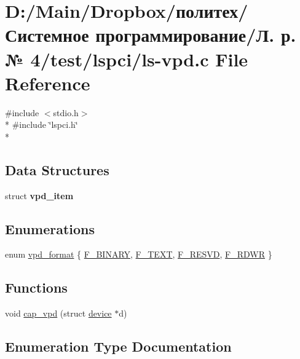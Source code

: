 \hypertarget{ls-vpd_8c}{}\section{D\+:/\+Main/\+Dropbox/политех/Системное программирование/Л. р. № 4/test/lspci/ls-\/vpd.c File Reference}
\label{ls-vpd_8c}
{\ttfamily \#include $<$stdio.\+h$>$}\\*
{\ttfamily \#include \char`\"{}lspci.\+h\char`\"{}}\\*
\subsection*{Data Structures}
\begin{DoxyCompactItemize}
\item 
struct {\bfseries vpd\+\_\+item}
\end{DoxyCompactItemize}
\subsection*{Enumerations}
\begin{DoxyCompactItemize}
\item 
enum \hyperlink{ls-vpd_8c_a3677f90b4ba602604ae100f7cd432ce0}{vpd\+\_\+format} \{ \hyperlink{ls-vpd_8c_a3677f90b4ba602604ae100f7cd432ce0af7bedbb8f65a713c35af0ce26c183557}{F\+\_\+\+B\+I\+N\+A\+RY}, 
\hyperlink{ls-vpd_8c_a3677f90b4ba602604ae100f7cd432ce0addeaf9c02c09455d048c8197c3fa9a83}{F\+\_\+\+T\+E\+XT}, 
\hyperlink{ls-vpd_8c_a3677f90b4ba602604ae100f7cd432ce0a1fab147ed6ce4a1d2d1a9b1c005ad81d}{F\+\_\+\+R\+E\+S\+VD}, 
\hyperlink{ls-vpd_8c_a3677f90b4ba602604ae100f7cd432ce0abdcd4804e0b90394f2f5bad2a1fff650}{F\+\_\+\+R\+D\+WR}
 \}
\end{DoxyCompactItemize}
\subsection*{Functions}
\begin{DoxyCompactItemize}
\item 
void \hyperlink{ls-vpd_8c_a0667de07cd253b2f7c4771d170c43ddc}{cap\+\_\+vpd} (struct \hyperlink{structdevice}{device} $\ast$d)
\end{DoxyCompactItemize}


\subsection{Enumeration Type Documentation}

